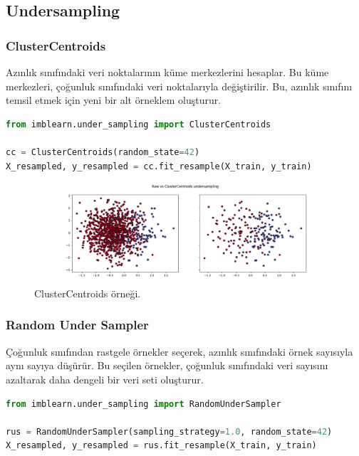 \subsection{Undersampling}

\subsubsection{ClusterCentroids}
Azınlık sınıfındaki veri noktalarının küme merkezlerini hesaplar. Bu küme merkezleri, çoğunluk sınıfındaki veri noktalarıyla değiştirilir. Bu, azınlık sınıfını temsil etmek için yeni bir alt örneklem oluşturur.

\begin{lstlisting}[language=Python]
from imblearn.under_sampling import ClusterCentroids

cc = ClusterCentroids(random_state=42)
X_resampled, y_resampled = cc.fit_resample(X_train, y_train)
\end{lstlisting}

\begin{figure}[h]
    \centering
    \includegraphics[width=1\textwidth]{images/Raw vs ClusterCentroids undersampling.png}
    \caption{ClusterCentroids örneği.}
    \label{fig:enter-label}
\end{figure}

\subsubsection{Random Under Sampler}
Çoğunluk sınıfından rastgele örnekler seçerek, azınlık sınıfındaki örnek sayısıyla aynı sayıya düşürür. Bu seçilen örnekler, çoğunluk sınıfındaki veri sayısını azaltarak daha dengeli bir veri seti oluşturur.

\begin{lstlisting}[language=Python]
from imblearn.under_sampling import RandomUnderSampler

rus = RandomUnderSampler(sampling_strategy=1.0, random_state=42)
X_resampled, y_resampled = rus.fit_resample(X_train, y_train)
\end{lstlisting}


